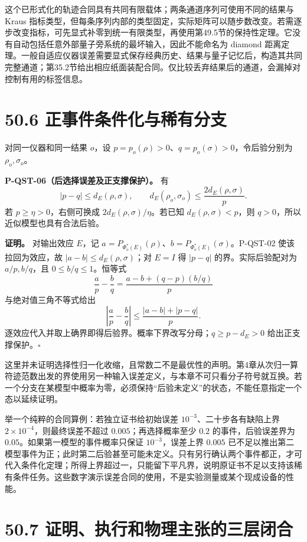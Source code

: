\documentclass[
  11pt,
  oneside]{book}
\begin{document}
这个已形式化的轨迹合同具有共同有限载体；两条通道序列可使用不同的结果与
Kraus
指标类型，但每条序列内部的类型固定，实际矩阵可以随步数改变。若需逐步改变指标，可先显式补零到统一有限类型，再使用第49.5节的保持性定理。它没有自动包括任意外部量子旁系统的最坏输入，因此不能命名为
diamond
距离定理。一般自适应仪器误差需要显式保存经典历史、结果与量子记忆后，构造其共同完整通道；第35.2节给出相应纸面装配合同。仅比较丢弃结果后的通道，会漏掉对控制有用的标签信息。

\section{50.6 正事件条件化与稀有分支}

对同一仪器和同一结果 \(o\)，设
\(p=p_o(\rho)>0\)、\(q=p_o(\sigma)>0\)，令后验分别为
\(\rho_o,\sigma_o\)。

\protect\hypertarget{p-qst-06}{}{}

\textbf{P-QST-06（后选择误差及正支撑保护）。} 有 \[
|p-q|\le d_E(\rho,\sigma),\qquad
d_E(\rho_o,\sigma_o)\le \frac{2d_E(\rho,\sigma)}{p}.
\] 若 \(p\ge\eta>0\)，右侧可换成 \(2d_E(\rho,\sigma)/\eta\)。若已知
\(d_E(\rho,\sigma)<p\)，则 \(q>0\)，所以近似模型也具有合法后验。

\textbf{证明。} 对输出效应 \(E\)，记
\(a=P_{\Phi_o^*(E)}(\rho)\)、\(b=P_{\Phi_o^*(E)}(\sigma)\)。P-QST-02
使该拉回为效应，故 \(|a-b|\le d_E(\rho,\sigma)\)；对 \(E=I\) 得
\(|p-q|\) 的界。实际后验配对为 \(a/p,b/q\)，且 \(0\le b/q\le1\)。恒等式
\[
\frac ap-\frac bq=
\frac{a-b+(q-p)(b/q)}p
\] 与绝对值三角不等式给出 \[
\left|\frac ap-\frac bq\right|
\le\frac{|a-b|+|p-q|}{p}.
\] 逐效应代入并取上确界即得后验界。概率下界改写分母；\(q\ge p-d_E>0\)
给出正支撑保护。\(\square\)

这里并未证明选择性归一化收缩，且常数二不是最优性的声明。第4章从次归一算符迹范数出发的界使用另一种输入误差定义，与本章不可只看分子符号就互换。若一个分支在某模型中概率为零，必须保持``后验未定义''的状态，不能任意指定一个态以延续证明。

举一个纯粹的合同算例：若独立证书给初始误差
\(10^{-3}\)、二十步各有缺陷上界 \(2\times10^{-4}\)，则最终误差不超过
\(0.005\)；再选择概率至少 \(0.2\) 的事件，后验误差界为
\(0.05\)。如果第一模型的事件概率只保证 \(10^{-3}\)，误差上界 \(0.005\)
已不足以推出第二模型事件为正；此时第二后验甚至可能未定义。只有另行确认两个事件都正，才可代入条件化定理；所得上界超过一，只能留下平凡界，说明原证书不足以支持该稀有条件任务。这些数字演示误差合同的使用，不是实验测量或某个现成设备的性能。

\section{50.7 证明、执行和物理主张的三层闭合}
\end{document}
